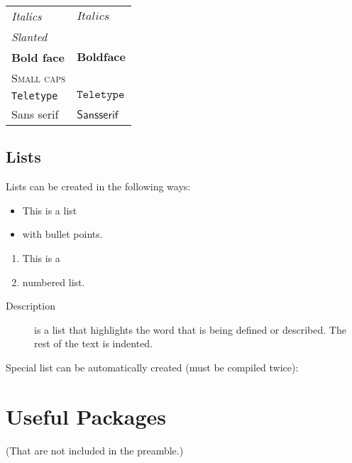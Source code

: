 \documentclass[a4paper]{memoir}
\begin{document}
\begin{center}
    \begin{tabular}{ll}
        \textit{Italics}    & \(\mathit{Italics}\)    \\
        \textsl{Slanted}    &                         \\
        \textbf{Bold face}  & \(\mathbf{Bold face}\)  \\
        \textsc{Small caps} &                         \\
        \texttt{Teletype}   & \(\mathtt{Teletype}\)   \\
        \textsf{Sans serif} & \(\mathsf{Sans serif}\)
    \end{tabular}
\end{center}


\section{Lists}
Lists can be created in the following ways:

\begin{itemize}
    \item
    This is a list

    \item
    with bullet points.
\end{itemize}

\begin{enumerate}
    \item
    This is a

    \item
    numbered list.
\end{enumerate}

\begin{description}
    \item[Description]
    is a list that highlights the word that is being defined or described. The rest of the text is indented.
\end{description}

Special list can be automatically created (must be compiled twice):

\tableofcontents
\listoffigures
\listoftables


\chapter{Useful Packages}


(That are not included in the preamble.)
\end{document}
